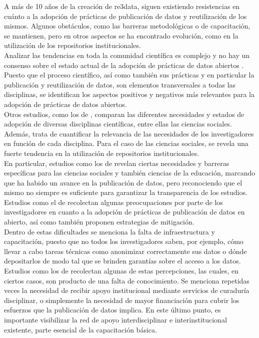 \documentclass{article}
\begin{document}
A más de 10 años de la creación de re3data, siguen existiendo resistencias en cuánto a la adopción de prácticas de publicación de datos y reutilización de los mismos. Algunos obstáculos, como las barreras metodológicas o de capacitación, se mantienen, pero en otros aspectos se ha encontrado evolución, como en la utilización de los repositorios institucionales.\\

Analizar las tendencias en toda la comunidad científica es complejo y no hay un consenso sobre el estado actual de la adopción de prácticas de datos abiertos \cite{zuiderwijk2020}. Puesto que el proceso científico, así como también sus prácticas y en particular la publicación y reutilización de datos, son elementos transversales a todas las disciplinas, se identifican los aspectos positivos y negativos más relevantes para la adopción de prácticas de datos abiertos.\\

Otros estudios, como los de \cite{khan2023}, comparan las diferentes necesidades y estados de adopción de diversas disciplinas científicas, entre ellas las ciencias sociales. Además, trata de cuantificar la relevancia de las necesidades de los investigadores en función de cada disciplina. Para el caso de las ciencias sociales, se revela una fuerte tendencia en la utilización de repositorios institucionales.\\

En particular, estudios como los de \cite{kraehmer2023} revelan ciertas necesidades y barreras específicas para las ciencias sociales y también ciencias de la educación, marcando que ha habido un avance en la publicación de datos, pero reconociendo que el mismo no siempre es suficiente para garantizar la transparencia de los estudios.\\

Estudios como el de \cite{pasquetto2024} recolectan algunas preocupaciones por parte de los investigadores en cuanto a la adopción de prácticas de publicación de datos en abierto, así como también proponen estrategias de mitigación.\\

Dentro de estas dificultades se menciona la falta de infraestructura y capacitación, puesto que no todos los investigadores saben, por ejemplo, cómo llevar a cabo tareas técnicas como anonimizar correctamente sus datos o dónde depositarlos de modo tal que se brinden garantías sobre el acceso a los datos. Estudios como los de \cite{gomes2022} recolectan algunas de estas percepciones, las cuales, en ciertos casos, son producto de una falta de conocimiento. Se menciona repetidas veces la necesidad de recibir apoyo institucional mediante servicios de curaduría disciplinar, o simplemente la necesidad de mayor financiación para cubrir los esfuerzos que la publicación de datos implica. En este último punto, es importante visibilizar la red de apoyo interdisciplinar e interinstitucional existente, parte esencial de la capacitación básica.\\
\end{document}
